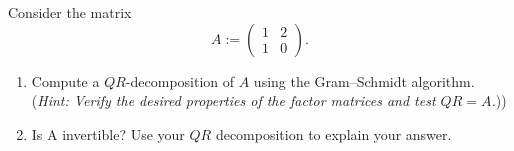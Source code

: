 
Consider the matrix
$$
	A := \begin{pmatrix}
		1&2\\
		1&0
	\end{pmatrix}.
$$ 
\begin{enumerate}
	\item Compute a $QR$-decomposition of $A$ using the Gram--Schmidt algorithm.\\
	      (\textit{Hint: Verify the desired properties of the factor matrices and test $QR= A$.}))
	\item Is A invertible? Use your $QR$ decomposition to explain your answer.
\end{enumerate}